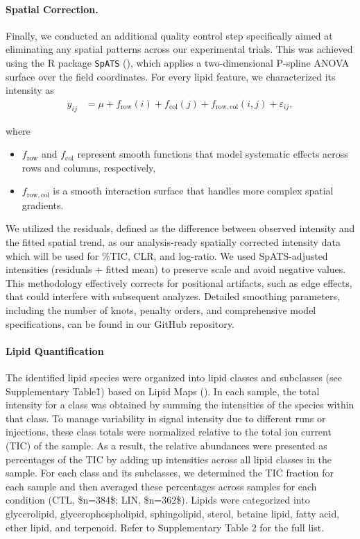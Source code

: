 \documentclass[9pt,twocolumn,twoside]{rilabRxiv}
\begin{document}
\paragraph{Spatial Correction.}
Finally, we conducted an additional quality control step specifically aimed at eliminating any spatial patterns across our experimental trials. This was achieved using the R package \texttt{SpATS} (\cite{RodriguezAlvarez2018}), which applies a two-dimensional P-spline ANOVA surface over the field coordinates. For every lipid feature, we characterized its intensity as
\begin{align}
  y_{ij} &= \mu + f_{\mathrm{row}}(i) + f_{\mathrm{col}}(j) + f_{\mathrm{row,col}}(i,j) + \varepsilon_{ij},
\end{align}

where 
\begin{itemize}
  \item \(f_{\mathrm{row}}\) and \(f_{\mathrm{col}}\) represent smooth functions that model systematic effects across rows and columns, respectively, 
  \item \(f_{\mathrm{row,col}}\) is a smooth interaction surface that handles more complex spatial gradients. 
\end{itemize}

We utilized the residuals, defined as the difference between observed intensity and the fitted spatial trend, as our analysis-ready spatially corrected intensity data which will be used for \%TIC, CLR, and log-ratio. We used SpATS-adjusted intensities (residuals + fitted mean) to preserve scale and avoid negative values. This methodology effectively corrects for positional artifacts, such as edge effects, that could interfere with subsequent analyzes. Detailed smoothing parameters, including the number of knots, penalty orders, and comprehensive model specifications, can be found in our GitHub repository.

\paragraph{Lipid Quantification}
The identified lipid species were organized into lipid classes and subclasses (see Supplementary Table\~1) based on Lipid Maps (\cite{Fahy2009LipidMapsClass}). In each sample, the total intensity for a class was obtained by summing the intensities of the species within that class. To manage variability in signal intensity due to different runs or injections, these class totals were normalized relative to the total ion current (TIC) of the sample. As a result, the relative abundances were presented as percentages of the TIC by adding up intensities across all lipid classes in the sample. For each class and its subclasses, we determined the TIC fraction for each sample and then averaged these percentages across samples for each condition (CTL, \$n=384\$; LIN, \$n=362\$). Lipids were categorized into glycerolipid, glycerophospholipid, sphingolipid, sterol, betaine lipid, fatty acid, ether lipid, and terpenoid. Refer to Supplementary Table 2 for the full list. 
\end{document}
